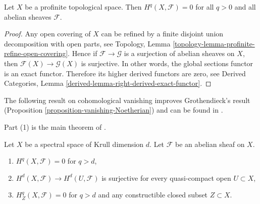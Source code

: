 \begin{lemma}
\label{lemma-vanishing-for-profinite}
Let $X$ be a profinite topological space. Then $H^q(X, \mathcal{F}) = 0$
for all $q > 0$ and all abelian sheaves $\mathcal{F}$.
\end{lemma}

\begin{proof}
Any open covering of $X$ can be refined by a finite disjoint union
decomposition with open parts, see
Topology, Lemma \ref{topology-lemma-profinite-refine-open-covering}.
Hence if $\mathcal{F} \to \mathcal{G}$ is a surjection of abelian
sheaves on $X$, then $\mathcal{F}(X) \to \mathcal{G}(X)$ is surjective.
In other words, the global sections functor is an exact functor.
Therefore its higher derived functors are zero, see
Derived Categories, Lemma \ref{derived-lemma-right-derived-exact-functor}.
\end{proof}

\noindent
The following result on cohomological vanishing
improves Grothendieck's result
(Proposition \ref{proposition-vanishing-Noetherian})
and can be found in \cite{Scheiderer}.

\begin{proposition}
\label{proposition-cohomological-dimension-spectral}
\begin{reference}
Part (1) is the main theorem of \cite{Scheiderer}.
\end{reference}
Let $X$ be a spectral space of Krull dimension $d$.
Let $\mathcal{F}$ be an abelian sheaf on $X$.
\begin{enumerate}
\item $H^q(X, \mathcal{F}) = 0$ for $q > d$,
\item $H^d(X, \mathcal{F}) \to H^d(U, \mathcal{F})$ is surjective
for every quasi-compact open $U \subset X$,
\item $H^q_Z(X, \mathcal{F}) = 0$ for $q > d$ and any constructible
closed subset $Z \subset X$.
\end{enumerate}
\end{proposition}

